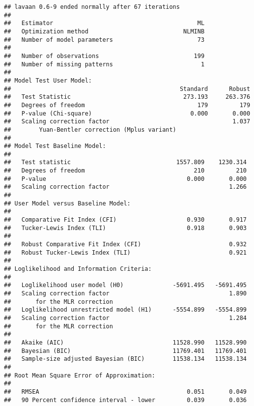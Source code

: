 \documentclass[
  english,
  man]{apa6}
\begin{document}
\begin{verbatim}
## lavaan 0.6-9 ended normally after 67 iterations
## 
##   Estimator                                         ML
##   Optimization method                           NLMINB
##   Number of model parameters                        73
##                                                       
##   Number of observations                           199
##   Number of missing patterns                         1
##                                                       
## Model Test User Model:
##                                                Standard      Robust
##   Test Statistic                                273.193     263.376
##   Degrees of freedom                                179         179
##   P-value (Chi-square)                            0.000       0.000
##   Scaling correction factor                                   1.037
##        Yuan-Bentler correction (Mplus variant)                     
## 
## Model Test Baseline Model:
## 
##   Test statistic                              1557.809    1230.314
##   Degrees of freedom                               210         210
##   P-value                                        0.000       0.000
##   Scaling correction factor                                  1.266
## 
## User Model versus Baseline Model:
## 
##   Comparative Fit Index (CFI)                    0.930       0.917
##   Tucker-Lewis Index (TLI)                       0.918       0.903
##                                                                   
##   Robust Comparative Fit Index (CFI)                         0.932
##   Robust Tucker-Lewis Index (TLI)                            0.921
## 
## Loglikelihood and Information Criteria:
## 
##   Loglikelihood user model (H0)              -5691.495   -5691.495
##   Scaling correction factor                                  1.890
##       for the MLR correction                                      
##   Loglikelihood unrestricted model (H1)      -5554.899   -5554.899
##   Scaling correction factor                                  1.284
##       for the MLR correction                                      
##                                                                   
##   Akaike (AIC)                               11528.990   11528.990
##   Bayesian (BIC)                             11769.401   11769.401
##   Sample-size adjusted Bayesian (BIC)        11538.134   11538.134
## 
## Root Mean Square Error of Approximation:
## 
##   RMSEA                                          0.051       0.049
##   90 Percent confidence interval - lower         0.039       0.036

\end{verbatim}
\end{document}
